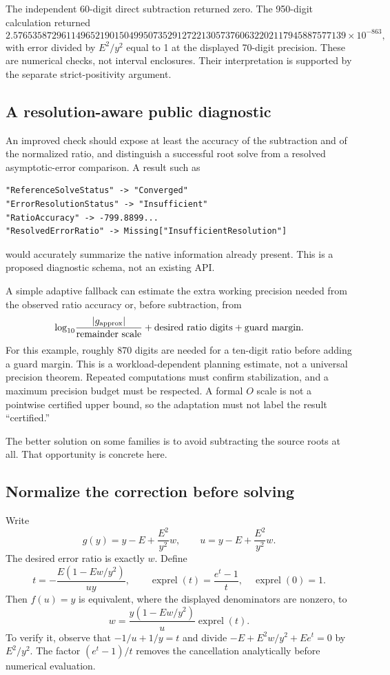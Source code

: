 \documentclass[11pt,letterpaper]{article}
\begin{document}
The independent 60-digit direct subtraction returned zero. The 950-digit
calculation returned
\[
 2.576535872961149652190150499507352912722130573760632202117945887577139
 \times10^{-863},
\]
with error divided by $E^2/y^2$ equal to 1 at the displayed 70-digit precision.
These are numerical checks, not interval enclosures. Their interpretation is
supported by the separate strict-positivity argument.

\subsection{A resolution-aware public diagnostic}
An improved check should expose at least the accuracy of the subtraction and
of the normalized ratio, and distinguish a successful root solve from a
resolved asymptotic-error comparison. A result such as
\begin{lstlisting}
"ReferenceSolveStatus" -> "Converged"
"ErrorResolutionStatus" -> "Insufficient"
"RatioAccuracy" -> -799.8899...
"ResolvedErrorRatio" -> Missing["InsufficientResolution"]
\end{lstlisting}
would accurately summarize the native information already present.
This is a proposed diagnostic schema, not an existing API.

A simple adaptive fallback can estimate the extra working precision needed
from the observed ratio accuracy or, before subtraction, from
\[
 \log_{10}\!\frac{|g_{\rm approx}|}{\text{remainder scale}}
       +\text{desired ratio digits}+\text{guard margin}.
\]
For this example, roughly 870 digits are needed for a ten-digit ratio before
adding a guard margin. This is a workload-dependent planning estimate, not a
universal precision theorem. Repeated computations must confirm stabilization,
and a maximum precision budget must be respected. A formal $O$ scale is not
a pointwise certified upper bound, so the adaptation must not label the result
``certified.''

The better solution on some families is to avoid subtracting the source roots
at all. That opportunity is concrete here.

\subsection{Normalize the correction before solving}
Write
\[
 g(y)=y-E+\frac{E^2}{y^2}w,
 \qquad u=y-E+\frac{E^2}{y^2}w.
\]
The desired error ratio is exactly $w$. Define
\[
 t=-\frac{E(1-Ew/y^2)}{uy},\qquad
 \operatorname{exprel}(t)=\frac{e^t-1}{t},
 \quad \operatorname{exprel}(0)=1.
\]
Then $f(u)=y$ is equivalent, where the displayed denominators are nonzero, to
\begin{equation}
 w=\frac{y(1-Ew/y^2)}{u}\operatorname{exprel}(t).
 \label{eq:normalized}
\end{equation}
To verify it, observe that $-1/u+1/y=t$ and divide
$-E+E^2w/y^2+Ee^t=0$ by $E^2/y^2$. The factor $(e^t-1)/t$ removes the
cancellation analytically before numerical evaluation.
\end{document}
